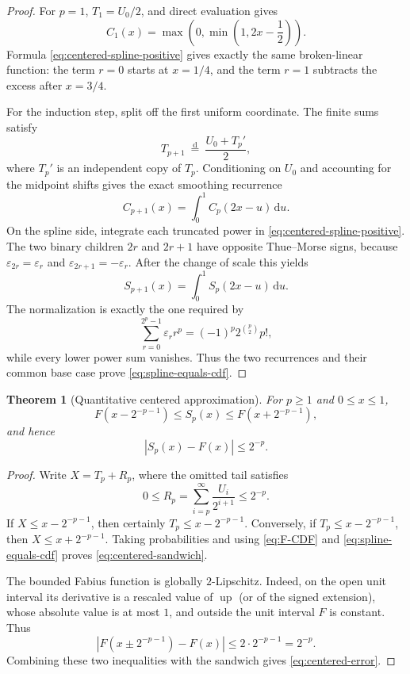 \documentclass[11pt,oneside]{article}
\newtheorem{theorem}{Theorem}[section]
\theoremstyle{definition}
\theoremstyle{remark}
\newcommand{\Up}{\operatorname{up}}
\newcommand{\dd}{\,\mathrm d}
\begin{document}
\begin{proof}
For $p=1$, $T_1=U_0/2$, and direct evaluation gives
\[
 C_1(x)=\max\left(0,\min\left(1,2x-\frac12\right)\right).
\]
Formula \eqref{eq:centered-spline-positive} gives exactly the same broken-linear
function: the term $r=0$ starts at $x=1/4$, and the term $r=1$ subtracts the excess
after $x=3/4$.

For the induction step, split off the first uniform coordinate.  The finite sums satisfy
\[
 T_{p+1}\ \overset{\mathrm d}=\ \frac{U_0+T_p'}2,
\]
where $T_p'$ is an independent copy of $T_p$.  Conditioning on $U_0$ and accounting for
the midpoint shifts gives the exact smoothing recurrence
\begin{equation}
 C_{p+1}(x)=\int_0^1 C_p(2x-u)\dd u.                      \label{eq:centered-cdf-smoothing}
\end{equation}
On the spline side, integrate each truncated power in
\eqref{eq:centered-spline-positive}.  The two binary children $2r$ and $2r+1$
have opposite Thue--Morse signs, because
\(\varepsilon_{2r}=\varepsilon_r\) and
\(\varepsilon_{2r+1}=-\varepsilon_r\).  After the change of scale this yields
\begin{equation}
 S_{p+1}(x)=\int_0^1 S_p(2x-u)\dd u.                      \label{eq:centered-spline-smoothing}
\end{equation}
The normalization is exactly the one required by
\[
 \sum_{r=0}^{2^p-1}\varepsilon_r r^p
 =(-1)^p2^{\binom p2}p!,
\]
while every lower power sum vanishes.  Thus the two recurrences and their common base
case prove \eqref{eq:spline-equals-cdf}.
\end{proof}

\begin{theorem}[Quantitative centered approximation]
\label{thm:centered-spline-error}
For $p\ge1$ and $0\le x\le1$,
\begin{equation}
 F(x-2^{-p-1})\le S_p(x)\le F(x+2^{-p-1}),                \label{eq:centered-sandwich}
\end{equation}
and hence
\begin{equation}
 |S_p(x)-F(x)|\le2^{-p}.                                  \label{eq:centered-error}
\end{equation}
\end{theorem}

\begin{proof}
Write $X=T_p+R_p$, where the omitted tail satisfies
\[
 0\le R_p=\sum_{i=p}^{\infty}\frac{U_i}{2^{i+1}}\le2^{-p}.
\]
If $X\le x-2^{-p-1}$, then certainly
$T_p\le x-2^{-p-1}$.  Conversely, if
$T_p\le x-2^{-p-1}$, then
$X\le x+2^{-p-1}$.  Taking probabilities and using
\eqref{eq:F-CDF} and \eqref{eq:spline-equals-cdf} proves
\eqref{eq:centered-sandwich}.

The bounded Fabius function is globally $2$-Lipschitz.  Indeed, on the open unit interval
its derivative is a rescaled value of $\Up$ (or of the signed extension), whose absolute
value is at most $1$, and outside the unit interval $F$ is constant.  Thus
\[
 |F(x\pm2^{-p-1})-F(x)|\le2\cdot2^{-p-1}=2^{-p}.
\]
Combining these two inequalities with the sandwich gives
\eqref{eq:centered-error}.
\end{proof}
\end{document}
